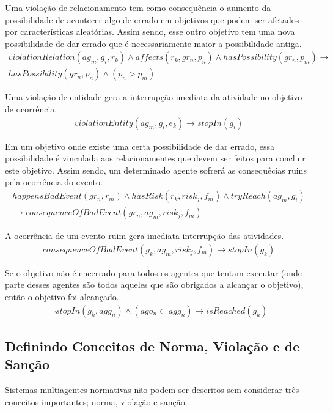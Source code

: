 \documentclass[12pt]{article}
\begin{document}
Uma violação de relacionamento tem como consequência o aumento da possibilidade de acontecer algo de errado em objetivos que podem ser afetados por características aleatórias. Assim sendo, esse outro objetivo tem uma nova possibilidade de dar errado que é necessariamente maior a possibilidade antiga.
\begin{eqnarray}\label{rel11}\nonumber
	violationRelation(ag_m,g_i,r_k) \wedge affects(r_k,gr_n,p_n) \wedge hasPossibility(gr_n,p_m) \to \\  
	hasPossibility(gr_n,p_n) \wedge (p_n > p_m)
\end{eqnarray}

Uma violação de entidade gera a interrupção imediata da atividade no objetivo de ocorrência.
\begin{eqnarray}\label{rel12}
	violationEntity(ag_m,g_i,e_k) \to stopIn(g_i)
\end{eqnarray}

Em um objetivo onde existe uma certa possibilidade de dar errado, essa possibilidade é vinculada aos relacionamentes que devem ser feitos para concluir este objetivo. Assim sendo, um determinado agente sofrerá as consequêcias ruins pela ocorrência do evento.
\begin{eqnarray}\label{rel13}\nonumber
	happensBadEvent(gr_n,r_m) \wedge hasRisk(r_k,risk_j,f_m) \wedge tryReach(ag_m,g_i) \nonumber \\ 
	\to consequenceOfBadEvent(gr_n,ag_m,risk_j,f_m)
\end{eqnarray}

A ocorrência de um evento ruim gera imediata interrupção das atividades.
\begin{eqnarray}\label{rel14}
	consequenceOfBadEvent(g_k,ag_m,risk_j,f_m) \to stopIn(g_k)
\end{eqnarray}

Se o objetivo não é encerrado para todos os agentes que tentam executar (onde parte desses agentes são todos aqueles que são obrigados a alcançar o objetivo), então o objetivo foi alcançado.  
\begin{eqnarray}\label{rel15}
	\neg stopIn(g_k,agg_n) \wedge (ago_n \subset agg_n) \to isReached(g_k)
\end{eqnarray}

\subsection{Definindo Conceitos de Norma, Violação e de Sanção}

Sistemas multiagentes normativas não podem ser descritos sem considerar três conceitos importantes; norma, violação e sanção. 
\end{document}
